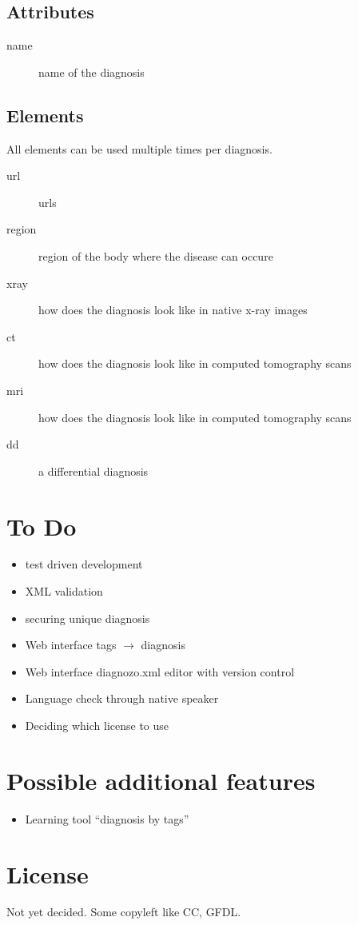 \documentclass{article}
\begin{document}
\subsection{Attributes}

\begin{description}
	\item[name] name of the diagnosis
\end{description}

\subsection{Elements}
All elements can be used multiple times per diagnosis.

\begin{description}
	\item[url] urls
	\item[region] region of the body where the disease can occure
	\item[xray] how does the diagnosis look like in native x-ray images
	\item[ct] how does the diagnosis look like in computed tomography scans
	\item[mri] how does the diagnosis look like in computed tomography scans
	\item[dd] a differential diagnosis
\end{description}

\section{To Do}
\begin{itemize}
\item test driven development
\item XML validation
\item securing unique diagnosis
\item Web interface tags $\rightarrow$ diagnosis
\item Web interface diagnozo.xml editor with version control
\item Language check through native speaker
\item Deciding which license to use
\end{itemize}

\section{Possible additional features}
\begin{itemize}
\item Learning tool ``diagnosis by tags''
\end{itemize}

\section{License}
Not yet decided. Some copyleft like CC, GFDL.
\end{document}
